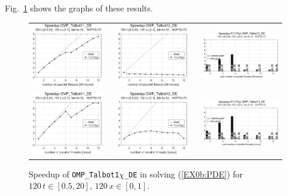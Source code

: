 \documentclass[a4paper,10pt]{report}%
\begin{document}
Fig.~\ref{PAR_EX0b_speedup_test} shows the graphs of these results.
\begin{figure}[htb]
\centering
\begin{tabular}{ccccc}
\includegraphics[height=0.2\textwidth]{./FIGS/EX0b/EX0b_test_speedup_11_Windows.eps} &&
\includegraphics[height=0.2\textwidth]{./FIGS/EX0b/EX0b_test_speedup_12_Windows.eps} &&
\includegraphics[height=0.2\textwidth,keepaspectratio=true]{./FIGS/EX0b/EX0b_test_speedup_13_Windows.eps} \\
\includegraphics[height=0.2\textwidth]{./FIGS/EX0b/EX0b_test_speedup_11_Linux.eps} &&
\includegraphics[height=0.2\textwidth]{./FIGS/EX0b/EX0b_test_speedup_12_Linux.eps} &&
\includegraphics[height=0.2\textwidth,keepaspectratio=true]{./FIGS/EX0b/EX0b_test_speedup_13_Linux.eps}
\end{tabular}
\caption{\small Speedup of {\tt OMP\_Talbot1$\chi$\_DE} in solving (\ref{EX0b:PDE}) for
$120\,t\in[0.5,20]$, $120\,x\in[0,1]$.}
\label{PAR_EX0b_speedup_test}
\end{figure}
\end{document}
